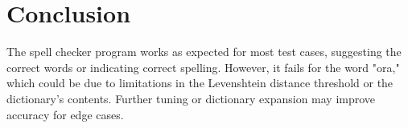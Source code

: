 \documentclass{article}
\begin{document}
\section*{Conclusion}
The spell checker program works as expected for most test cases, suggesting the correct words or indicating correct spelling. However, it fails for the word "ora," which could be due to limitations in the Levenshtein distance threshold or the dictionary's contents. Further tuning or dictionary expansion may improve accuracy for edge cases.
\end{document}
